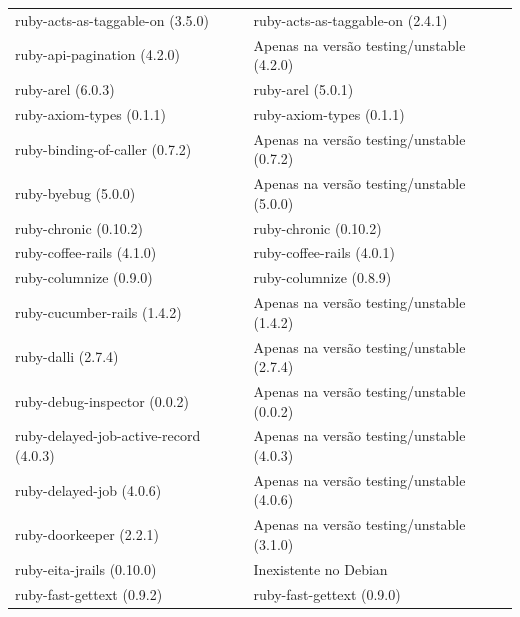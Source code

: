 \begin{anexosenv}
\begin{longtable}[H]{l|l}
        ruby-acts-as-taggable-on (3.5.0)                 & ruby-acts-as-taggable-on (2.4.1)                                  \\ 
         ruby-api-pagination (4.2.0)                     & Apenas na versão testing/unstable (4.2.0)  \\ 
        ruby-arel (6.0.3)                                & ruby-arel (5.0.1)                                                 \\ 
        ruby-axiom-types (0.1.1)                         & ruby-axiom-types (0.1.1)                                         \\ 
        ruby-binding-of-caller (0.7.2)                   & Apenas na versão testing/unstable (0.7.2)  \\ 
        ruby-byebug (5.0.0)                              & Apenas na versão testing/unstable (5.0.0)  \\ 
        ruby-chronic (0.10.2)                            & ruby-chronic (0.10.2)                                             \\ 
        ruby-coffee-rails (4.1.0)                        & ruby-coffee-rails (4.0.1)                                         \\ 
        ruby-columnize (0.9.0)                           & ruby-columnize (0.8.9)                                            \\ 
        ruby-cucumber-rails (1.4.2)                      & Apenas na versão testing/unstable (1.4.2)  \\ 
        ruby-dalli (2.7.4)                               & Apenas na versão testing/unstable (2.7.4)  \\ 
        ruby-debug-inspector (0.0.2)                     & Apenas na versão testing/unstable (0.0.2)  \\ 
         ruby-delayed-job-active-record (4.0.3)          & Apenas na versão testing/unstable (4.0.3)  \\ 
        ruby-delayed-job (4.0.6)                         & Apenas na versão testing/unstable (4.0.6)  \\ 
        ruby-doorkeeper (2.2.1)                          & Apenas na versão testing/unstable (3.1.0)  \\ 
        ruby-eita-jrails (0.10.0)                        & Inexistente no Debian                                             \\ 
        ruby-fast-gettext (0.9.2)                        & ruby-fast-gettext (0.9.0)                                         \\ 

\end{longtable}
\end{anexosenv}
